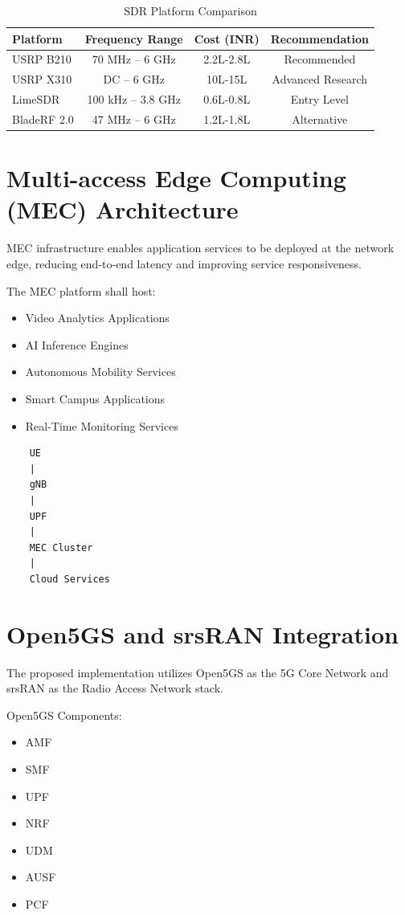 \documentclass[12pt,a4paper]{article}
\begin{document}
\begin{table}[h]
	\centering
	\caption{SDR Platform Comparison}
	\begin{tabular}{|l|c|c|c|}
		\hline
		Platform & Frequency Range & Cost (INR) & Recommendation \\
		\hline
		USRP B210 & 70 MHz -- 6 GHz & 2.2L-2.8L & Recommended \\
		USRP X310 & DC -- 6 GHz & 10L-15L & Advanced Research \\
		LimeSDR & 100 kHz -- 3.8 GHz & 0.6L-0.8L & Entry Level \\
		BladeRF 2.0 & 47 MHz -- 6 GHz & 1.2L-1.8L & Alternative \\
		\hline
	\end{tabular}
\end{table}

\section{Multi-access Edge Computing (MEC) Architecture}
MEC infrastructure enables application services to be deployed at the network edge, reducing end-to-end latency and improving service responsiveness.

The MEC platform shall host:

\begin{itemize}
	\item Video Analytics Applications
	\item AI Inference Engines
	\item Autonomous Mobility Services
	\item Smart Campus Applications
	\item Real-Time Monitoring Services
\end{itemize}

\begin{verbatim}
	UE
	|
	gNB
	|
	UPF
	|
	MEC Cluster
	|
	Cloud Services
\end{verbatim}

\section{Open5GS and srsRAN Integration}
The proposed implementation utilizes Open5GS as the 5G Core Network and srsRAN as the Radio Access Network stack.

Open5GS Components:

\begin{itemize}
	\item AMF
	\item SMF
	\item UPF
	\item NRF
	\item UDM
	\item AUSF
	\item PCF
\end{itemize}
\end{document}
